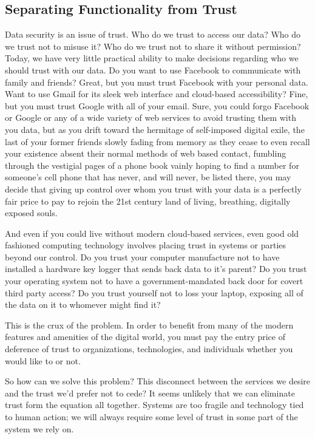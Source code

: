 \subsection{Separating Functionality from Trust}

Data security is an issue of trust. Who do we trust to access our
data? Who do we trust not to misuse it? Who do we trust not to share
it without permission? Today, we have very little practical ability to
make decisions regarding who we should trust with our data. Do you
want to use Facebook to communicate with family and friends? Great,
but you must trust Facebook with your personal data. Want to use Gmail
for its sleek web interface and cloud-based accessibility? Fine, but
you must trust Google with all of your email. Sure, you could forgo
Facebook or Google or any of a wide variety of web services to avoid
trusting them with you data, but as you drift toward the hermitage of
self-imposed digital exile, the last of your former friends slowly
fading from memory as they cease to even recall your existence absent
their normal methods of web based contact, fumbling through the
vestigial pages of a phone book vainly hoping to find a number for
someone's cell phone that has never, and will never, be listed there,
you may decide that giving up control over whom you trust with your
data is a perfectly fair price to pay to rejoin the 21st century land
of living, breathing, digitally exposed souls.

And even if you could live without modern cloud-based services, even
good old fashioned computing technology involves placing trust in
systems or parties beyond our control. Do you trust your computer
manufacture not to have installed a hardware key logger that sends
back data to it's parent? Do you trust your operating system not to
have a government-mandated back door for covert third party access?
Do you trust yourself not to loss your laptop, exposing all of the
data on it to whomever might find it?

This is the crux of the problem. In order to benefit from many of the
modern features and amenities of the digital world, you must pay the
entry price of deference of trust to organizations, technologies, and
individuals whether you would like to or not.

So how can we solve this problem? This disconnect between the services
we desire and the trust we'd prefer not to cede? It seems unlikely
that we can eliminate trust form the equation all together. Systems
are too fragile and technology tied to human action; we will always
require some level of trust in some part of the system we rely on.

